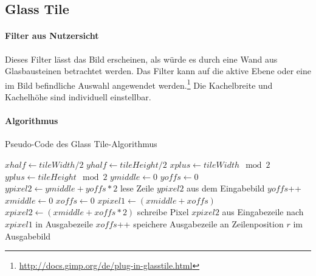 \newpage
\subsection{Glass Tile}

\paragraph{Filter aus Nutzersicht}

Dieses Filter lässt das Bild erscheinen, als würde es durch eine Wand aus Glasbausteinen betrachtet werden. Das Filter kann auf die aktive Ebene oder eine im Bild befindliche Auswahl angewendet werden.\footnote{\url{http://docs.gimp.org/de/plug-in-glasstile.html}} Die Kachelbreite und Kachelhöhe sind individuell einstellbar.

\paragraph{Algorithmus}

\begin{algorithm}[h]
\caption{Pseudo-Code des \glqq Glass Tile\grqq-Algorithmus}
\label{algo:gtile}
\begin{algorithmic}[1]
\State $xhalf \gets tileWidth  / 2$
\State $yhalf \gets tileHeight / 2$
\State $xplus \gets tileWidth  \mod 2$
\State $yplus \gets tileHeight \mod 2$
\State $ymiddle \gets 0$
\State $yoffs \gets 0$
	\State $ypixel2 \gets ymiddle + yoffs * 2$
	\State lese Zeile $ypixel2$ aus dem Eingabebild
	\State $yoffs$++
	\EndIf
	\State $xmiddle \gets 0$
	\State $xoffs \gets 0$
		\State $xpixel1 \gets (xmiddle + xoffs)$
		\State $xpixel2 \gets (xmiddle + xoffs * 2)$
		\State schreibe Pixel $xpixel2$ aus Eingabezeile nach $xpixel1$ in Ausgabezeile
		\State $xoffs$++
		\EndIf
	\EndFor
	\State speichere Ausgabezeile an Zeilenposition $r$ im Ausgabebild
\EndFor	
\end{algorithmic}
\end{algorithm}

